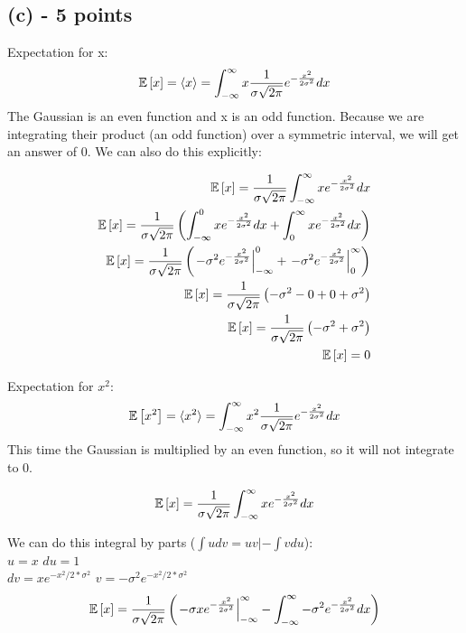 \documentclass[11pt]{article}
\begin{document}
\subsection*{(c) - 5 points}
Expectation for x:
\begin{equation}
\mathbb{E}\left[x\right] = \langle x\rangle = \int_{-\infty}^{\infty} x \frac{1}{\sigma\sqrt{2\pi}}e^{-\frac{x^2}{2\sigma^2}} dx  
\end{equation}
The Gaussian is an even function and x is an odd function.  Because we are integrating their product (an odd function) over a symmetric interval, we will get an answer of 0.  We can also do this explicitly:

\begin{eqnarray*}
\mathbb{E}\left[x\right] = \frac{1}{\sigma\sqrt{2\pi}} \int_{-\infty}^{\infty} x e^{-\frac{x^2}{2\sigma^2}} dx \\
\mathbb{E}\left[x\right] = \frac{1}{\sigma\sqrt{2\pi}} \left(\int_{-\infty}^{0} x e^{-\frac{x^2}{2\sigma^2}} dx + \int_{0}^{\infty} x e^{-\frac{x^2}{2\sigma^2}} dx \right) \\
\mathbb{E}\left[x\right] = \frac{1}{\sigma\sqrt{2\pi}} \left(\left.-\sigma^2e^{-\frac{x^2}{2\sigma^2}}\right|_{-\infty}^{0}+\left.-\sigma^2e^{-\frac{x^2}{2\sigma^2}}\right|_{0}^{\infty}\right) \\
\mathbb{E}\left[x\right] = \frac{1}{\sigma\sqrt{2\pi}} \left(-\sigma^2-0+0+\sigma^2\right) \\
\mathbb{E}\left[x\right] = \frac{1}{\sigma\sqrt{2\pi}} \left(-\sigma^2+\sigma^2\right) \\
\mathbb{E}\left[x\right] = 0
\end{eqnarray*}

Expectation for $x^2$:
\begin{equation}
\mathbb{E}\left[x^2\right] = \langle x^2\rangle = \int_{-\infty}^{\infty} x^2 \frac{1}{\sigma\sqrt{2\pi}}e^{-\frac{x^2}{2\sigma^2}} dx  
\end{equation}
This time the Gaussian is multiplied by an even function, so it will not integrate to 0.

\begin{eqnarray*}
\mathbb{E}\left[x\right] = \frac{1}{\sigma\sqrt{2\pi}} \int_{-\infty}^{\infty} x e^{-\frac{x^2}{2\sigma^2}} dx
\end{eqnarray*}

We can do this integral by parts ($\int udv=uv|-\int vdu$): \\
$u=x$ $du=1$ \\
$dv=xe^{-x^2/{2*\sigma^2}}$ $v=-\sigma^2 e^{-x^2/{2*\sigma^2}}$ \\

\begin{eqnarray*}
\mathbb{E}\left[x\right] = \frac{1}{\sigma\sqrt{2\pi}} \left( \left. -\sigma x e^{-\frac{x^2}{2\sigma^2}}\right|_{-\infty}^{\infty} - \int_{-\infty}^{\infty} -\sigma^2 e^{-\frac{x^2}{2\sigma^2}} dx \right) \\
\end{eqnarray*}
\end{document}
